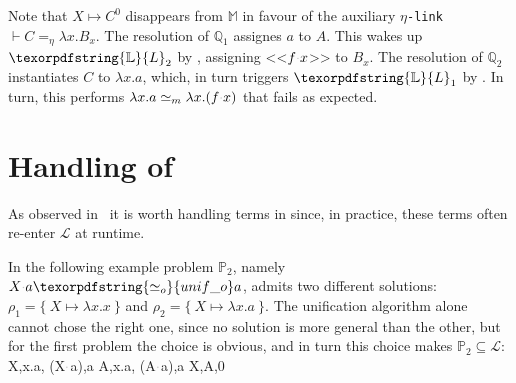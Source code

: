 \documentclass[sigconf,natbib=false,review]{acmart}
\newcommand{\appsep}{\ensuremath{\textcolor{lightgray}{\cdot}}}
\newcommand{\UnifRel}{\ensuremath{\simeq}}
\newcommand{\Uo}{\texorpdfstring{\ensuremath{\UnifRel_o}\xspace}{unif\_o}}
\newcommand{\Ue}{\ensuremath{\UnifRel_m}\xspace}
\newcommand{\llambda}{\ensuremath{\mathcal{L}}\xspace}
\newcommand{\linkMacro}[1]{\ensuremath{#1}\texttt{-link}\xspace}
\newcommand{\linketa} {\linkMacro{\eta}}
\newcommand{\Fo}{\texorpdfstring{\ensuremath{\mathcal{O}}\xspace}{O}}
\newcommand{\linketaM}[3]{\ensuremath{#1 \vdash #2 =_\eta #3}}
\newcommand{\mapping}[3]{\ensuremath{#1 \mapsto #2^#3}}
\newcommand{\rhs}{rhs\xspace}
\newcommand{\linkStore}{\texorpdfstring{\ensuremath{\mathbb{L}}\xspace}{L}}
\newcommand{\mapStore}{\texorpdfstring{\ensuremath{\mathbb{M}}\xspace}{M}}
\newcommand{\foUnifPb}{\ensuremath{\mathbb{P}}\xspace}
\newcommand{\hoUnifPb}{\ensuremath{\mathbb{Q}}\xspace}
\begin{document}
\noindent
Note that $\mapping{X}{C}{0}$ disappears from \mapStore
in favour of the auxiliary \linketa \linketaM{}{C}{\lambda x.B_{x}}.
The resolution of $\hoUnifPb_1$ assignes $a$ to $A$. This wakes up
$\linkStore_2$ by \progressetaleft, assigning <<$f \appsep x$>> to $B_x$.
The resolution of $\hoUnifPb_2$ instantiates $C$ to $\lambda x.a$, which, in
turn triggers $\linkStore_1$ by \progressetaleft. In turn, this performs
$\lambda x.a \Ue \lambda x.(f \appsep x)$ that fails as expected.

\begin{comment}
\printAlll
  {{{\lambda x.\lambda y.(X\appsep y\appsep x),\lambda x.\lambda y.x},
    {\lambda x.(f\appsep (X\appsep x)\appsep x),Y}}}
  {{{A,\lambda x.\lambda y.x},
    {D,F}}}
  {{{Y,F,0},
    {X,C,2}}}
  {{{\eta,x,E_{x},\lambda y.C_{x y}},
    {\eta,,D,\lambda x.(f\appsep E_{x}\appsep x)},
    {\eta,,A,\lambda x.B_{x}},
    {\eta,x,B_{x},\lambda y.C_{y x}}}}

\noindent
The resolution of $\hoUnifPb_1$ assigns $\lambda x.\lambda y.x$ to $A$
that in turn triggers $\linkStore_3$ and then $\linkStore_4$ by \progressetaleft,
one per $\lambda$ in the solution of $A$.
The unification variable $C_{yx}$ is therefore unified with $x$
(the second variable of its scope).
As a result $\linkStore_1$ becomes \linketaM{x}{E_x}{\lambda y.y},
and the \rhs is no more in \maybeeta so \progressetaright fires and
$E_x$ is unified with $\lambda y.y$; then $\linkStore_2$ makes progress thanks to the same 
rule giving
$\sigma = \{~ A \mapsto \lambda x.\lambda y.x ~;~ B_x \mapsto \lambda y.x ~;~ C_{yx} \mapsto x ~;~ D \mapsto f\appsep (\lambda y.y) ~;~ E_x \mapsto \lambda y.y ~\}$.\\
The remaining step $\hoUnifPb_2$ identifies $D$ with $F$,
hence the resulting \Fo{} substitution is
$\rho = \{X \mapsto \lambda x.\lambda y.y ~;~ Y \mapsto f\appsep (\lambda y.y)\}$.
\end{comment}

\section{Handling of \notllambda}\label{sec:beta}

As observed in~\cite{Nadathur2001} it is worth 
handling terms in \notllambda since, in practice, these terms often
re-enter \llambda at runtime.

In the following example problem $\foUnifPb_2$, namely $X \appsep a \Uo a$,
admits two different solutions: $\rho_1 = \{~X \mapsto \lambda x.x~\}$
and $\rho_2 = \{~X \mapsto \lambda x.a~\}$.
The unification algorithm alone
cannot chose the right one, since no solution is more general than the other,
but for the first problem the choice is obvious, and in turn
this choice makes $\foUnifPb_2 \subseteq \llambda$:
%
\printAlll
  {{{X,\lambda x.a},
    {(X\appsep a),a}}}
  {{{A,\lambda x.a},
    {(A\appsep a),a}}}
  {{{X,A,0}}}
  {{}}
\end{document}
